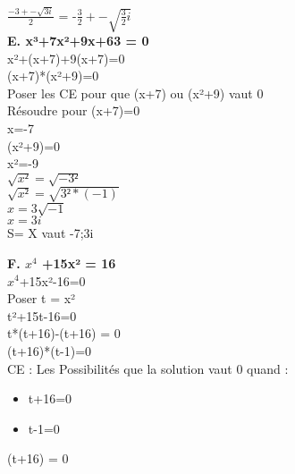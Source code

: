 $\frac{-3+-\sqrt{3i}}{2}$ = -$\frac{3}{2} +- \sqrt{\frac{3}{2}i}$ \\

\vspace{10mm} %
\textbf{E. x³+7x²+9x+63 = 0} \\

x²+(x+7)+9(x+7)=0 \\

(x+7)*(x²+9)=0 \\

Poser les CE pour que (x+7) ou (x²+9) vaut 0 \\

Résoudre pour (x+7)=0 \\

x=-7 \\

(x²+9)=0 \\

x²=-9 \\

$\sqrt{x²} =\sqrt{-3²}$ \\

$\sqrt{x²}=\sqrt{3²*(-1)}$ \\

$x=3\sqrt{-1}$ \\

$x=3i$ \\

S= X vaut -7;3i \\

\newpage

\textbf{F. $x^{4}$ +15x² = 16} \\

$x^{4}$+15x²-16=0 \\

Poser t = x² \\

t²+15t-16=0 \\

t*(t+16)-(t+16) = 0 \\

(t+16)*(t-1)=0 \\


CE : Les Possibilités que la solution vaut 0 quand :

\begin{itemize}
\item {t+16=0}
\item {t-1=0}
\end{itemize}

(t+16) = 0 \\

